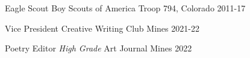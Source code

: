 

%
%
%
%

\begin{cvhonors}
  \cvhonor
    {Eagle Scout} 
    {Boy Scouts of America}
    {Troop 794, Colorado}
    {2011-17}

  \cvhonor
    {Vice President} 
    {Creative Writing Club}
    {Mines}
    {2021-22}

  \cvhonor
    {Poetry Editor} 
    {\textit{High Grade} Art Journal}
    {Mines}
    {2022}

\end{cvhonors}
